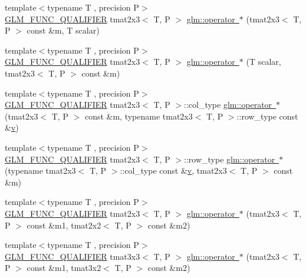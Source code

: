 \begin{DoxyCompactItemize}
\item 
{\footnotesize template$<$typename T , precision P$>$ }\\\mbox{\hyperlink{setup_8hpp_a33fdea6f91c5f834105f7415e2a64407}{G\+L\+M\+\_\+\+F\+U\+N\+C\+\_\+\+Q\+U\+A\+L\+I\+F\+I\+ER}} tmat2x3$<$ T, P $>$ \mbox{\hyperlink{namespaceglm_a17107db1ab0412d3c5ed69023bd4eaf6}{glm\+::operator $\ast$}} (tmat2x3$<$ T, P $>$ const \&m, T scalar)
\item 
{\footnotesize template$<$typename T , precision P$>$ }\\\mbox{\hyperlink{setup_8hpp_a33fdea6f91c5f834105f7415e2a64407}{G\+L\+M\+\_\+\+F\+U\+N\+C\+\_\+\+Q\+U\+A\+L\+I\+F\+I\+ER}} tmat2x3$<$ T, P $>$ \mbox{\hyperlink{namespaceglm_a6ad8e23895c3dfe1e24d952b8605799d}{glm\+::operator $\ast$}} (T scalar, tmat2x3$<$ T, P $>$ const \&m)
\item 
{\footnotesize template$<$typename T , precision P$>$ }\\\mbox{\hyperlink{setup_8hpp_a33fdea6f91c5f834105f7415e2a64407}{G\+L\+M\+\_\+\+F\+U\+N\+C\+\_\+\+Q\+U\+A\+L\+I\+F\+I\+ER}} tmat2x3$<$ T, P $>$\+::col\+\_\+type \mbox{\hyperlink{namespaceglm_a5dda39b3050cf49e1cbdea6a4836b74b}{glm\+::operator $\ast$}} (tmat2x3$<$ T, P $>$ const \&m, typename tmat2x3$<$ T, P $>$\+::row\+\_\+type const \&\mbox{\hyperlink{glad_8h_a14cfbe2fc2234f5504618905b69d1e06}{v}})
\item 
{\footnotesize template$<$typename T , precision P$>$ }\\\mbox{\hyperlink{setup_8hpp_a33fdea6f91c5f834105f7415e2a64407}{G\+L\+M\+\_\+\+F\+U\+N\+C\+\_\+\+Q\+U\+A\+L\+I\+F\+I\+ER}} tmat2x3$<$ T, P $>$\+::row\+\_\+type \mbox{\hyperlink{namespaceglm_ac20404f356d3ec5db1739af016ce1485}{glm\+::operator $\ast$}} (typename tmat2x3$<$ T, P $>$\+::col\+\_\+type const \&\mbox{\hyperlink{glad_8h_a14cfbe2fc2234f5504618905b69d1e06}{v}}, tmat2x3$<$ T, P $>$ const \&m)
\item 
{\footnotesize template$<$typename T , precision P$>$ }\\\mbox{\hyperlink{setup_8hpp_a33fdea6f91c5f834105f7415e2a64407}{G\+L\+M\+\_\+\+F\+U\+N\+C\+\_\+\+Q\+U\+A\+L\+I\+F\+I\+ER}} tmat2x3$<$ T, P $>$ \mbox{\hyperlink{namespaceglm_a66a34bd4a68f3a13539b66e222d56b7b}{glm\+::operator $\ast$}} (tmat2x3$<$ T, P $>$ const \&m1, tmat2x2$<$ T, P $>$ const \&m2)
\item 
{\footnotesize template$<$typename T , precision P$>$ }\\\mbox{\hyperlink{setup_8hpp_a33fdea6f91c5f834105f7415e2a64407}{G\+L\+M\+\_\+\+F\+U\+N\+C\+\_\+\+Q\+U\+A\+L\+I\+F\+I\+ER}} tmat3x3$<$ T, P $>$ \mbox{\hyperlink{namespaceglm_ad180dbec9d8c93e31d32d32409a05e0c}{glm\+::operator $\ast$}} (tmat2x3$<$ T, P $>$ const \&m1, tmat3x2$<$ T, P $>$ const \&m2)

\end{DoxyCompactItemize}
